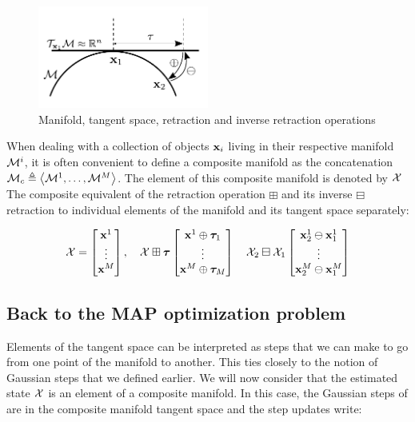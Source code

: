\begin{figure}[h]
    \centering
    \includegraphics[width=0.5\textwidth]{figures/manifold.pdf}
    \caption{Manifold, tangent space, retraction and inverse retraction operations}
    \label{fig:manifold}
\end{figure}

When dealing with a collection of objects ${\bf x}_i$ living in their respective manifold $\mathcal{M}^i$, it is often convenient to define a composite manifold
as the concatenation $\mathcal{M}_c \triangleq \left<\mathcal{M}^1, \dots, \mathcal{M}^M \right>$. The element of this composite manifold is denoted by $\mathcal{X}$
The composite equivalent of the retraction operation $\boxplus$ and 
its inverse $\boxminus$ retraction to individual elements of the manifold and its tangent space separately:

\begin{equation}
    \mathcal{X}=
    \begin{bmatrix}
        {\bf x}^1 \\
        \vdots \\
        {\bf x}^M
    \end{bmatrix},
    \quad
    \mathcal{X} \boxplus {\bm \tau}
    \begin{bmatrix}
        {\bf x}^1 \oplus {\bm \tau}_1 \\
        \vdots \\
        {\bf x}^M \oplus {\bm \tau}_M
    \end{bmatrix}
    \quad
    \mathcal{X}_2 \boxminus \mathcal{X}_1
    \begin{bmatrix}
        {\bf x}^1_2 \ominus {\bf x}^1_1 \\
        \vdots \\
        {\bf x}^M_2 \ominus {\bf x}^M_1
    \end{bmatrix}
\end{equation}



\subsection{Back to the MAP optimization problem}
Elements of the tangent space can be interpreted as steps that we can make to go from one point of the manifold to another.
This ties closely to the notion of Gaussian steps that we defined earlier. We will now consider that the estimated state $\mathcal{X}$
is an element of a composite manifold. In this case, the Gaussian steps of 
are in the composite manifold tangent space and the step updates write:

